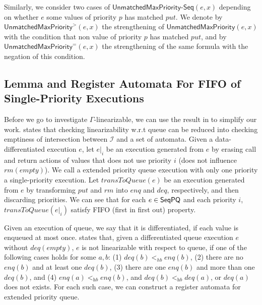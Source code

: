 Similarly, we consider two cases of $\mathsf{UnmatchedMaxPriority\text{-}Seq}(e,x)$ depending on whether $e$ some values of priority $p$ has matched $\textit{put}$. We denote by $\mathsf{UnmatchedMaxPriority}^{>}(e,x)$ the strengthening of $\mathsf{UnmatchedMaxPriority}(e,x)$ with the condition that non value of priority $p$ has matched $\textit{put}$, and by $\mathsf{UnmatchedMaxPriority}^{=}(e,x)$ the strengthening of the same formula with the negation of this condition.




\subsection{Lemma and Register Automata For FIFO of Single-Priority Executions}
\label{sec:appendix lemma and register automata for FIFO of single-priority executions}

Before we go to investigate $\Gamma$-linearizable, we can use the result in \cite{DBLP:conf/icalp/BouajjaniEEH15} to simplify our work. \cite{DBLP:conf/icalp/BouajjaniEEH15} states that checking linearizability w.r.t queue can be reduced into checking emptiness of intersection between $\mathcal{I}$ and a set of automata. Given a data-differentiated execution $e$, let $e \vert_{i}$ be an execution generated from $e$ by erasing call and return actions of values that does not use priority $i$ (does not influence $\textit{rm}(\textit{empty})$). We call a extended priority queue execution with only one priority a single-priority execution. Let $\textit{transToQueue}(e)$ be an execution generated from $e$ by transforming $\textit{put}$ and $\textit{rm}$ into $\textit{enq}$ and $\textit{deq}$, respectively, and then discarding priorities. We can see that for each $e \in \mathsf{SeqPQ}$ and each priority $i$, $\textit{transToQueue}(e \vert_{i})$ satisfy FIFO (first in first out) property.

Given an execution of queue, we say that it is differentiated, if each value is enqueued at most once. \cite{DBLP:conf/icalp/BouajjaniEEH15} states that, given a differentiated queue execution $e$ without $\textit{deq}(\textit{empty})$, $e$ is not linearizable with respect to queue, if one of the following cases holds for some $a,b$: (1) $\textit{deq}(b) <_{hb} \textit{enq}(b)$, (2) there are no $\textit{enq}(b)$ and at least one $\textit{deq}(b)$, (3) there are one $\textit{enq}(b)$ and more than one $\textit{deq}(b)$, and (4) $\textit{enq}(a) <_{\textit{hb}} \textit{enq}(b)$, and $\textit{deq}(b) <_{\textit{hb}} \textit{deq}(a)$, or $\textit{deq}(a)$ does not exists. For each such case, we can construct a register automata for extended priority queue.

